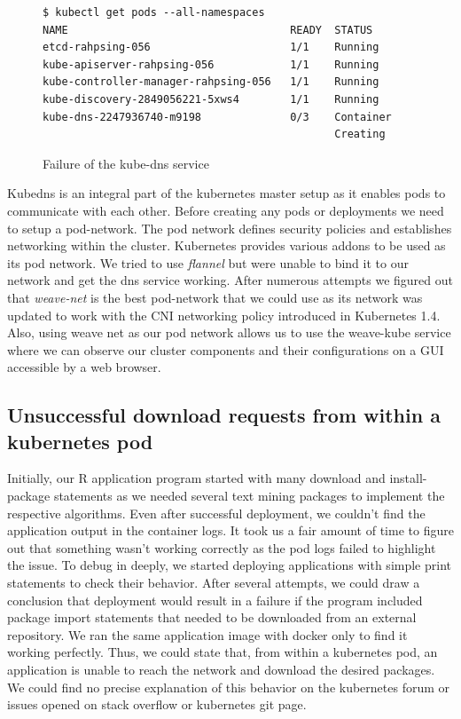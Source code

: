 \documentclass[9pt,twocolumn,twoside]{../../styles/osajnl}
\begin{document}
\begin{figure}[H]
\begin{verbatim}
$ kubectl get pods --all-namespaces
NAME                                   READY  STATUS       
etcd-rahpsing-056                      1/1    Running          
kube-apiserver-rahpsing-056            1/1    Running           
kube-controller-manager-rahpsing-056   1/1    Running           
kube-discovery-2849056221-5xws4        1/1    Running         
kube-dns-2247936740-m9198              0/3    Container
                                              Creating
\end{verbatim}
\vspace{-3mm}
\caption{Failure of the kube-dns service}
\vspace{-3mm}
\label{Instantiation failure of the kube-dns service}
\end{figure}
Kubedns is an integral part of the kubernetes master setup as it
enables pods to communicate with each other. Before creating any pods
or deployments we need to setup a pod-network. The pod network defines
security policies and establishes networking within the
cluster. Kubernetes provides various addons to be used as its pod
network. We tried to use \emph{flannel} but were unable to bind it to
our network and get the dns service working. After numerous attempts
we figured out that \emph{weave-net} is the best pod-network that we
could use as its network was updated to work with the CNI networking
policy introduced in Kubernetes 1.4. Also, using weave net as our pod
network allows us to use the weave-kube service where we can observe
our cluster components and their configurations on a GUI accessible by
a web browser.

\subsection{Unsuccessful download requests from within a kubernetes pod}

Initially, our R application program started with many download and
install-package statements as we needed several text mining packages
to implement the respective algorithms. Even after successful
deployment, we couldn't find the application output in the container
logs. It took us a fair amount of time to figure out that something
wasn't working correctly as the pod logs failed to highlight the
issue. To debug in deeply, we started deploying applications with
simple print statements to check their behavior. After several
attempts, we could draw a conclusion that deployment would result in a
failure if the program included package import statements that needed
to be downloaded from an external repository. We ran the same
application image with docker only to find it working perfectly. Thus,
we could state that, from within a kubernetes pod, an application is
unable to reach the network and download the desired packages. We
could find no precise explanation of this behavior on the kubernetes
forum or issues opened on stack overflow or kubernetes git page.
\end{document}
